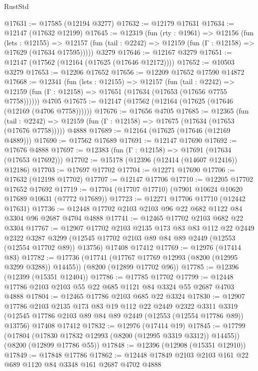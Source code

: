 \begin{lexlean}{RustStd}
\begin{coremodule}
@17631 := @17585 (@12194 @3277)
@17632 := @12179 @17631
@17634 := @12147 (@17632 @12199)
@17645 := @12319
    (fun (rty : @1961) =>
    @12156
      (fun (lets : @12155) =>
      @12157 (fun (tail : @2242) => @12159 (fun (Γ : @12158) => @17629 (@17634 @17595)))))
    @3279
@17646 := @12167 @3279
@17651 := @12147 (@17562 (@12164 (@17625 (@17646 @12172))))
@17652 := @10503 @3279
@17653 := @12206 @17652
@17656 := @12209 @17652 @17590 @14872
@17668 := @12341
    (fun (lets : @12155) =>
    @12157
      (fun (tail : @2242) =>
      @12159 (fun (Γ : @12158) => @17651 (@17634 (@17653 (@17656 @7755 @7758))))))
    @4705
@17675 := @12147 (@17562 (@12164 (@17625 (@17646 (@12169 (@4706 @7758))))))
@17676 := @17656 @4705
@17685 := @12365
    (fun (tail : @2242) => @12159 (fun (Γ : @12158) => @17675 (@17634 (@17653 (@17676 @7758)))))
    @4888
@17689 := @12164 (@17625 (@17646 (@12169 @4889)))
@17690 := @17562 @17689
@17691 := @12147 @17690
@17692 := @17676 @4888
@17697 := @12383 (fun (Γ : @12158) => @17691 (@17634 (@17653 @17692)))
@17702 := @15178 (@12396 (@12414 (@14607 @12416)) @12186)
@17703 := @17697 @17702
@17704 := @12271 @17690
@17706 := @17632 (@12198 @17702)
@17707 := @12147 @17706
@17710 := @12205 @17702 @17652 @17692
@17719 := @17704 (@17707 @17710) (@7901 @10624 @10620 @17689 @10631 (@7772 @17689))
@17723 := @12271 @17706 @17710 (@12442 @17631)
@17736 := @12448 @17702 @2103 @2103 @96 @22 @682 @1122 @84 @3304 @96 @2687 @4704 @4888
@17741 := @12465 @17702 @2103 @682 @22 @3304
@17767 := @12907
    @17702
    @2103
    @2135
    @173
    @83
    @83
    @112
    @22
    @2449
    @2322
    @3287
    @3299
    (@12545 @17702 @2103 @89 @84 @89 @2449 (@12553 (@12554 @17702 @89)) @13756)
    @17408
    @17412
@17769 := @12976 (@17414 @83)
@17782 := @17736
    (@17741 (@17767 @17769 @12993 (@8200 (@12995 @3299 @3288)) @14455))
    (@8200 (@12899 @17702 @96))
@17785 := @12396 (@12399 (@15351 @12404))
@17786 := @17785 @17702
@17799 := @12448 @17786 @2103 @2103 @55 @22 @685 @1121 @84 @3324 @55 @2687 @4703 @4888
@17804 := @12465 @17786 @2103 @685 @22 @3324
@17830 := @12907
    @17786
    @2103
    @2135
    @173
    @83
    @19
    @112
    @22
    @2449
    @2322
    @3311
    @3319
    (@12545 @17786 @2103 @89 @84 @89 @2449 (@12553 (@12554 @17786 @89)) @13756)
    @17408
    @17412
@17832 := @12976 (@17414 @19)
@17845 := @17799
    (@17804 (@17830 @17832 @12993 (@8200 (@12995 @3319 @3312)) @14455))
    (@8200 (@12899 @17786 @55))
@17848 := @12396 (@12908 (@15351 @12910))
@17849 := @17848 @17786
@17862 := @12448 @17849 @2103 @2103 @161 @22 @689 @1120 @84 @3348 @161 @2687 @4702 @4888

\end{coremodule}
\end{lexlean}
